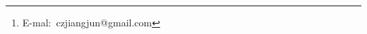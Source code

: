 \title{}
\author[]{姜骏\thanks{E-mal:~czjiangjun@gmail.com}}   %
\renewcommand*{\Authfont}{\small\rm} %
\renewcommand*{\Affilfont}{\small\it} %
\renewcommand\Authands{ and } %
\renewcommand\Authands{ , } %
\date{} %

\maketitle


